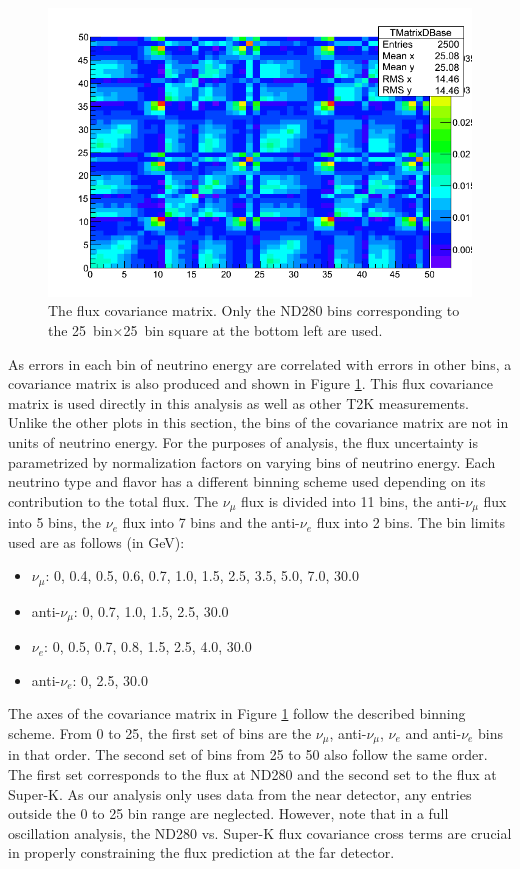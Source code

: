 \begin{figure}
\centering
\includegraphics[width=6in]{Figures/flux_cov_init.png}
\caption{The flux covariance matrix. Only the ND280 bins corresponding to the 25~bin$\times$25~bin square at the bottom left are used.}
\label{fig:fluxcov}
\end{figure}

As errors in each bin of neutrino energy are correlated with errors in other bins, a covariance matrix is also produced and shown in Figure \ref{fig:fluxcov}. This flux covariance matrix is used directly in this analysis as well as other T2K measurements. Unlike the other plots in this section, the bins of the covariance matrix are not in units of neutrino energy. For the purposes of analysis, the flux uncertainty is parametrized by normalization factors on varying bins of neutrino energy. Each neutrino type and flavor has a different binning scheme used depending on its contribution to the total flux. The $\nu_\mu$ flux is divided into 11 bins, the anti-$\nu_\mu$ flux into 5 bins, the $\nu_e$ flux into 7 bins and the anti-$\nu_e$ flux into 2 bins. The bin limits used are as follows (in GeV):

\begin{itemize}
\item $\nu_\mu$: 0, 0.4, 0.5, 0.6, 0.7, 1.0, 1.5, 2.5, 3.5, 5.0, 7.0, 30.0
\item anti-$\nu_\mu$: 0, 0.7, 1.0, 1.5, 2.5, 30.0
\item $\nu_e$: 0, 0.5, 0.7, 0.8, 1.5, 2.5, 4.0, 30.0
\item anti-$\nu_e$: 0, 2.5, 30.0
\end{itemize}

The axes of the covariance matrix in Figure \ref{fig:fluxcov} follow the described binning scheme. From 0 to 25, the first set of bins are the $\nu_\mu$, anti-$\nu_\mu$, $\nu_e$ and anti-$\nu_e$ bins in that order. The second set of bins from 25 to 50 also follow the same order. The first set corresponds to the flux at ND280 and the second set to the flux at Super-K. As our analysis only uses data from the near detector, any entries outside the 0 to 25 bin range are neglected. However, note that in a full oscillation analysis, the ND280 vs. Super-K flux covariance cross terms are crucial in properly constraining the flux prediction at the far detector.